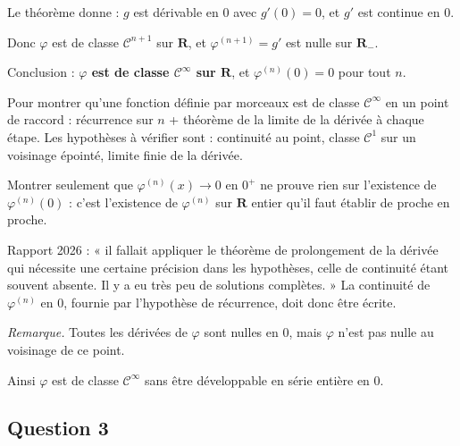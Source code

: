 \documentclass[11pt,a4paper]{article}
\begin{document}
Le théorème donne : \(g\) est dérivable en \(0\) avec \(g'(0)=0\), et \(g'\) est continue en \(0\).

Donc \(\varphi\) est de classe \(\mathcal C^{n+1}\) sur \(\mathbf R\), et \(\varphi^{(n+1)}=g'\) est nulle sur \(\mathbf R_-\).

Conclusion : \textbf{\(\varphi\) est de classe \(\mathcal C^\infty\) sur \(\mathbf R\)}, et \(\varphi^{(n)}(0)=0\) pour tout \(n\).

\begin{methode}

Pour montrer qu'une fonction définie par morceaux est de classe \(\mathcal C^\infty\) en un point de raccord : récurrence sur \(n\) + théorème de la limite de la dérivée à chaque étape. Les hypothèses à vérifier sont : continuité au point, classe \(\mathcal C^1\) sur un voisinage épointé, limite finie de la dérivée.

\end{methode}

\begin{piege}

Montrer seulement que \(\varphi^{(n)}(x)\to0\) en \(0^+\) ne prouve rien sur l'existence de \(\varphi^{(n)}(0)\) : c'est l'existence de \(\varphi^{(n)}\) sur \(\mathbf R\) entier qu'il faut établir de proche en proche.

\end{piege}

\begin{jury}

Rapport 2026 : « il fallait appliquer le théorème de prolongement de la dérivée qui nécessite une certaine précision dans les hypothèses, celle de continuité étant souvent absente. Il y a eu très peu de solutions complètes. » La continuité de \(\varphi^{(n)}\) en \(0\), fournie par l'hypothèse de récurrence, doit donc être écrite.

\end{jury}

\emph{Remarque.} Toutes les dérivées de \(\varphi\) sont nulles en \(0\), mais \(\varphi\) n'est pas nulle au voisinage de ce point.

Ainsi \(\varphi\) est de classe \(\mathcal C^\infty\) sans être développable en série entière en \(0\).

\hypertarget{question-3}{%
\subsection{Question 3}\label{question-3}}
\end{document}
